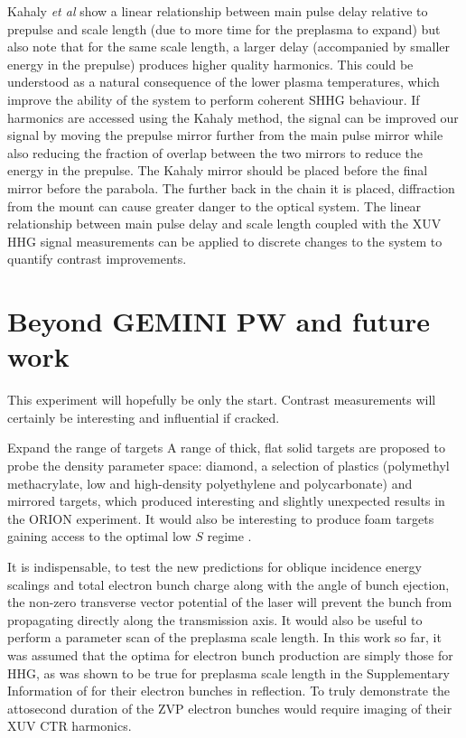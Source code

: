 Kahaly \textit{et al} show a linear relationship between main pulse delay relative to prepulse and scale length (due to more time for the preplasma to expand) but also note that for the same scale length, a larger delay (accompanied by smaller energy in the prepulse) produces higher quality harmonics. This could be understood as a natural consequence of the lower plasma temperatures, which improve the ability of the system to perform coherent SHHG behaviour. If harmonics are accessed using the Kahaly method, the signal can be improved our signal by moving the prepulse mirror further from the main pulse mirror while also reducing the fraction of overlap between the two mirrors to reduce the energy in the prepulse. The Kahaly mirror should be placed before the final mirror before the parabola. The further back in the chain it is placed, diffraction from the mount can cause greater danger to the optical system. The linear relationship between main pulse delay and scale length coupled with the XUV HHG signal measurements can be applied to discrete changes to the system to quantify contrast improvements.

\section{Beyond GEMINI PW and future work}\label{sec:ch4-beyond}
This experiment will hopefully be only the start. Contrast measurements will certainly be interesting and influential if cracked.

Expand the range of targets A range of thick, flat solid targets are proposed to probe the density parameter space: diamond, a selection of plastics (polymethyl methacrylate, low and high-density polyethylene and polycarbonate) and mirrored targets, which produced interesting and slightly unexpected results in the ORION experiment. It would also be interesting to produce foam targets gaining access to the optimal low $S$ regime \cite{bataniPhysicsIssuesShock2014}.

It is indispensable, to test the new predictions for oblique incidence energy scalings and total electron bunch charge along with the angle of bunch ejection, the non-zero transverse vector potential of the laser will prevent the bunch from propagating directly along the transmission axis. It would also be useful to perform a parameter scan of the preplasma scale length. In this work so far, it was assumed that the optima for electron bunch production are simply those for \ac{HHG}, as was shown to be true for preplasma scale length in the Supplementary Information of \cite{thevenetVacuumLaserAcceleration2016} for their electron bunches in reflection. To truly demonstrate the attosecond duration of the ZVP electron bunches would require imaging of their XUV CTR harmonics.

